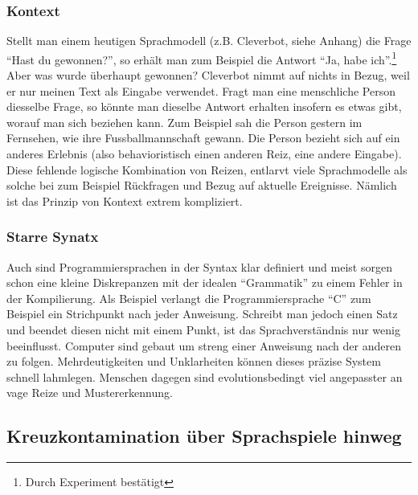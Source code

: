 \documentclass[10pt,a4paper]{article}
\begin{document}
\subsubsection{Kontext}
Stellt man einem heutigen Sprachmodell (z.B. Cleverbot, siehe Anhang) die Frage \enquote{Hast du gewonnen?}, so erhält man zum Beispiel die Antwort \enquote{Ja, habe ich}.\footnote{Durch Experiment bestätigt} Aber was wurde überhaupt gewonnen? Cleverbot nimmt auf nichts in Bezug, weil er nur meinen Text als Eingabe verwendet. Fragt man eine menschliche Person diesselbe Frage, so könnte man dieselbe Antwort erhalten insofern es etwas gibt, worauf man sich beziehen kann. Zum Beispiel sah die Person gestern im Fernsehen, wie ihre Fussballmannschaft gewann. Die Person bezieht sich auf ein anderes Erlebnis (also behavioristisch einen anderen Reiz, eine andere Eingabe). \\
Diese fehlende logische Kombination von Reizen, entlarvt viele Sprachmodelle als solche bei zum Beispiel Rückfragen und Bezug auf aktuelle Ereignisse. Nämlich ist das Prinzip von Kontext extrem kompliziert.

\subsubsection{Starre Synatx}
Auch sind Programmiersprachen in der Syntax klar definiert und meist sorgen schon eine kleine Diskrepanzen mit der idealen \enquote{Grammatik} zu einem Fehler in der Kompilierung. Als Beispiel verlangt die Programmiersprache \enquote{C} zum Beispiel ein Strichpunkt nach jeder Anweisung. Schreibt man jedoch einen Satz und beendet diesen nicht mit einem Punkt, ist das Sprachverständnis nur wenig beeinflusst. Computer sind gebaut um streng einer Anweisung nach der anderen zu folgen. Mehrdeutigkeiten und Unklarheiten können dieses präzise System schnell lahmlegen. Menschen dagegen sind evolutionsbedingt viel angepasster an vage Reize und Mustererkennung.

\subsection{Kreuzkontamination über Sprachspiele hinweg}
\end{document}
